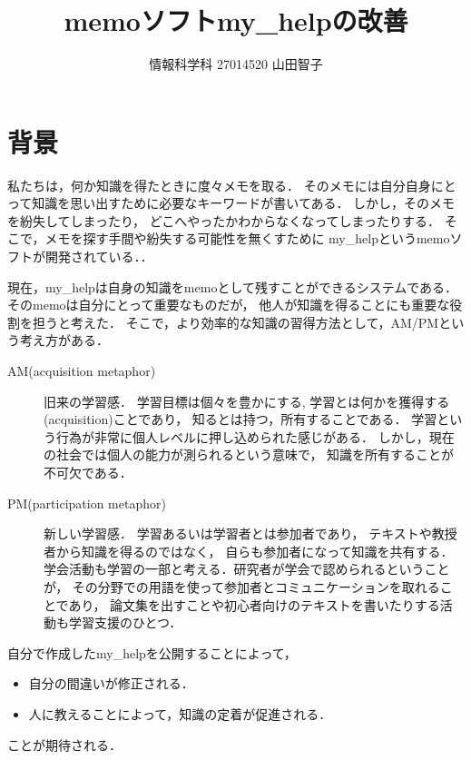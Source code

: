 \documentclass[a4j,twocolumn,uplatex]{jsarticle}
\begin{document}
\title{memoソフトmy\_helpの改善}
\author{情報科学科 \hspace{5mm} 27014520 \hspace{5mm}山田智子}
\date{}
\maketitle

\section{背景}
私たちは，何か知識を得たときに度々メモを取る．
そのメモには自分自身にとって知識を思い出すために必要なキーワードが書いてある． 
しかし，そのメモを紛失してしまったり，
どこへやったかわからなくなってしまったりする．
そこで，メモを探す手間や紛失する可能性を無くすために
my\_helpというmemoソフトが開発されている．\cite{my_help}．

現在，my\_helpは自身の知識をmemoとして残すことができるシステムである．
そのmemoは自分にとって重要なものだが，
他人が知識を得ることにも重要な役割を担うと考えた．
そこで，より効率的な知識の習得方法として，AM/PMという考え方がある．

\begin{description}
\item[AM(acquisition metaphor)] 旧来の学習感．                                       
学習目標は個々を豊かにする, 学習とは何かを獲得する(acquisition)ことであり，
知るとは持つ，所有することである．
学習という行為が非常に個人レベルに押し込められた感じがある．
しかし，現在の社会では個人の能力が測られるという意味で， 
知識を所有することが不可欠である．

\item[PM(participation metaphor)] 新しい学習感．
学習あるいは学習者とは参加者であり，
テキストや教授者から知識を得るのではなく，
自らも参加者になって知識を共有する．
学会活動も学習の一部と考える．研究者が学会で認められるということが，
その分野での用語を使って参加者とコミュニケーションを取れることであり，
論文集を出すことや初心者向けのテキストを書いたりする活動も学習支援のひとつ．
 \end{description}
 
自分で作成したmy\_helpを公開することによって，
\begin{itemize}
\item 自分の間違いが修正される．
\item 人に教えることによって，知識の定着が促進される．
\end{itemize}
ことが期待される．
\end{document}
